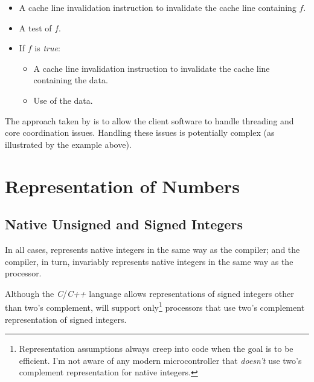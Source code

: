 \begin{itemize}
\begin{itemize}
\begin{itemize}
            \item A cache line invalidation instruction to
                  invalidate the
                  cache line containing $f$.
            \item A test of $f$.
            \item If $f$ is \emph{true}:
                  \begin{itemize}
                  \item A cache line invalidation
                        instruction to invalidate
                        the cache line containing the data.
                  \item Use of the data.
                  \end{itemize}
            \end{itemize}
      \end{itemize}
\end{itemize}

The approach taken by \emph{\productbasenameshort{}} is to 
allow the client software to handle threading and core 
coordination issues.  Handling these issues is potentially 
complex (as illustrated by the example above).  


\section{Representation of Numbers}
\label{cldd0:srnm0}


\subsection{Native Unsigned and Signed Integers}
\label{cldd0:srnm0:srin0}

In all cases, \emph{\productbasenameshort{}} represents 
native integers in the same way as the compiler; and the 
compiler, in turn, invariably represents native integers in 
the same way as the processor.  

Although the \emph{C}/\emph{C++} language allows 
representations of signed integers other than two's 
complement, \emph{\productbasenameshort{}} will support 
only\footnote{Representation assumptions always creep into 
code when the goal is to be efficient.  I'm not aware of any 
modern microcontroller that \emph{doesn't} use two's 
complement representation for native integers.} processors 
that use two's complement representation of signed integers.  


